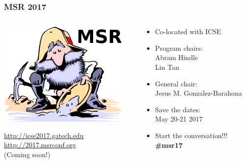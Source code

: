 \documentclass{beamer}
\begin{document}
\begin{frame}
\frametitle{MSR 2017}

\begin{columns}[T]
\begin{column}{.50\textwidth}
\includegraphics[width=6.5cm]{figs/msr-miner}

\begin{flushright}
  \url{http://icse2017.gatech.edu} \\
  \url{http://2017.msrconf.org} \\
  (Coming soon!)
\end{flushright}

\end{column}%
\hfill%
\begin{column}{.48\textwidth}
{\Large
\begin{itemize}
\item Co-located with ICSE
\item Program chairs: \\
  Abram Hindle \\
  Lin Tan \\
\item General chair: \\
  Jesus M. Gonzalez-Barahona \\
\item Save the dates: \\
  May 20-21 2017 \\
\item Start the conversation!!! \\
  \textbf{\#msr17} \\
\end{itemize}
}
\end{column}%
\end{columns}

\end{frame}
\end{document}
